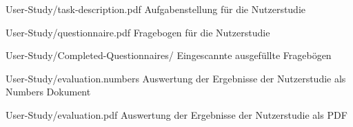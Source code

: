 \begin{fileslist}

\item[User-Study/task-description.pdf] 
Aufgabenstellung für die Nutzerstudie

\item[User-Study/questionnaire.pdf]
Fragebogen für die Nutzerstudie

\item[User-Study/Completed-Questionnaires/]
Eingescannte ausgefüllte Fragebögen

\item[User-Study/evaluation.numbers]
Auswertung der Ergebnisse der Nutzerstudie als Numbers Dokument

\item[User-Study/evaluation.pdf]
Auswertung der Ergebnisse der Nutzerstudie als PDF

\end{fileslist}
